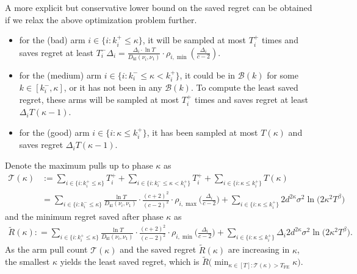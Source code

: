 \documentclass[twoside,11pt]{article}
\newcommand{\kl}{D_{\mathrm{kl}}}
\newcommand{\calB}{\mathcal{B}}
\newcommand{\calT}{\mathcal{T}}
\newcommand{\Tfe}{T_{\mathrm{FE}}}
\begin{document}
\begin{remark}
A more explicit but conservative lower bound on the saved regret can be obtained if we relax the above optimization problem further.
\begin{itemize}[leftmargin=*]
    \item for the (bad) arm $i\in\{i:k_i^+\leq \kappa\}$, it will be sampled at most $T_i^+$ times
    and saves regret at least
     $T_i^-\Delta_i=\frac{\Delta_i\cdot \ln T}{\kl(\nu_i,\nu_1)}\cdot \rho_{i,\min}(\frac{\Delta_i}{c-2})$.
     \item for the (medium) arm $i\in\{i:k_i^-\leq \kappa <k_i^+\}$, it could be in $\calB(k)$ for some $k\in[k_i^-,\kappa]$, or it has not been in any $\calB(k)$. To compute the least saved regret,
     these arms will be sampled at most $T_i^+$ times and saves regret at least $\Delta_i  T(\kappa-1)$.
     \item for the (good) arm $i\in\{i:\kappa \leq k_i^+\}$, it has been sampled at most $T(\kappa)$ and saves regret $\Delta_i T(\kappa-1)$.
\end{itemize}
Denote the maximum pulls up to phase $\kappa$ as
\begin{align}
    \calT(\kappa) &:= 
        \sum_{i\in\{i:k_i^+\leq \kappa\}}T_i^+
        +
        \sum_{i\in\{i:k_i^-\leq \kappa <k_i^+\}}T_i^+
        +
        \sum_{i\in\{i:\kappa \leq k_i^+\}}T(\kappa)
    \\
    &=\sum_{i\in\{i: k_i^-\leq \kappa\}}\frac{\ln T}{\kl(\nu_i,\nu_1)}\cdot \frac{(c+2)^2}{(c-2)^2}\cdot \rho_{i,\max}\bigg(\frac{\Delta_i}{c-2}\bigg)
    +
   \sum_{i\in\{i:\kappa \leq k_i^+\}}2d^{2\kappa}\sigma^2\ln\big(2\kappa^2 T^\beta\big)
\end{align}
and the minimum regret saved after phase $\kappa$ as
\begin{align}
    \tilde{R}(\kappa): = 
    \sum_{i\in\{i:k_i^+\leq \kappa\}}\frac{\ln T}{\kl(\nu_i,\nu_1)}\cdot\frac{(c+2)^2}{(c-2)^2}\cdot \rho_{i,\min}\bigg(\frac{\Delta_i}{c-2}\bigg)
    +
    \sum_{i\in\{i:\kappa \leq k_i^+\}}\Delta_{i}2d^{2\kappa}\sigma^2\ln\big(2\kappa^2 T^\beta\big).
\end{align}
As the arm pull count $\calT(\kappa)$ and the saved regret $\tilde{R}(\kappa)$ are increasing in $\kappa$, the smallest $\kappa$ yields the least saved regret, which is 
$ 
    \tilde{R}\big(\min_{ \kappa\in[T]: \calT(\kappa)>\Tfe } \kappa\big).
$

\end{remark}
\end{document}
